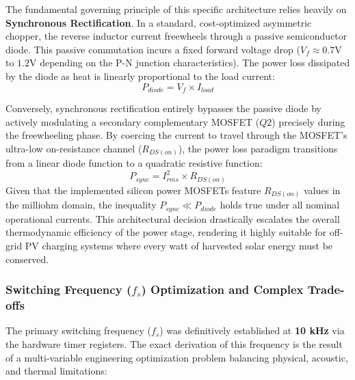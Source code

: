 The fundamental governing principle of this specific architecture relies heavily on \textbf{Synchronous Rectification}. In a standard, cost-optimized asymmetric chopper, the reverse inductor current freewheels through a passive semiconductor diode. This passive commutation incurs a fixed forward voltage drop ($V_f \approx 0.7\text{V}$ to $1.2\text{V}$ depending on the P-N junction characteristics). The power loss dissipated by the diode as heat is linearly proportional to the load current:
\begin{equation}
    P_{diode} = V_f \times I_{load}
    \label{eq:p_diode}
\end{equation}

Conversely, synchronous rectification entirely bypasses the passive diode by actively modulating a secondary complementary MOSFET ($Q2$) precisely during the freewheeling phase. By coercing the current to travel through the MOSFET's ultra-low on-resistance channel ($R_{DS(on)}$), the power loss paradigm transitions from a linear diode function to a quadratic resistive function:
\begin{equation}
    P_{sync} = I_{rms}^2 \times R_{DS(on)}
    \label{eq:p_sync}
\end{equation}
Given that the implemented silicon power MOSFETs feature $R_{DS(on)}$ values in the milliohm domain, the inequality $P_{sync} \ll P_{diode}$ holds true under all nominal operational currents. This architectural decision drastically escalates the overall thermodynamic efficiency of the power stage, rendering it highly suitable for off-grid PV charging systems where every watt of harvested solar energy must be conserved.

\subsubsection{Switching Frequency ($f_s$) Optimization and Complex Trade-offs}
The primary switching frequency ($f_s$) was definitively established at \textbf{10 kHz} via the hardware timer registers. The exact derivation of this frequency is the result of a multi-variable engineering optimization problem balancing physical, acoustic, and thermal limitations:

